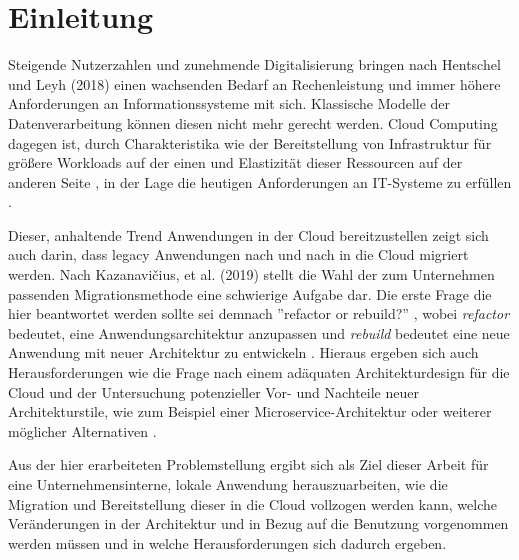 \chapter{Einleitung}
Steigende Nutzerzahlen und zunehmende Digitalisierung bringen nach Hentschel und Leyh (2018) einen wachsenden Bedarf an Rechenleistung und immer höhere Anforderungen an Informationssysteme mit sich. Klassische Modelle der Datenverarbeitung können diesen nicht mehr gerecht werden. Cloud Computing dagegen ist, durch Charakteristika wie der Bereitstellung von Infrastruktur für größere Workloads auf der einen und Elastizität dieser Ressourcen auf der anderen Seite \cite[Vgl.][S. 2]{Mell2011}, in der Lage die heutigen Anforderungen an IT-Systeme zu erfüllen \cite[Vgl.][S. 6]{Reinheimer2018}.

Dieser, anhaltende Trend Anwendungen in der Cloud bereitzustellen zeigt sich auch darin, dass legacy Anwendungen nach und nach in die Cloud migriert werden. Nach Kazanavičius, et al. (2019) stellt die Wahl der zum Unternehmen passenden Migrationsmethode eine schwierige Aufgabe dar. Die erste Frage die hier beantwortet werden sollte sei demnach ''refactor or rebuild?'' \cite[Vgl.][S. 4]{Kazanavicius2019}, wobei \textit{refactor} bedeutet, eine Anwendungsarchitektur anzupassen und \textit{rebuild} bedeutet eine neue Anwendung mit neuer Architektur zu entwickeln \cite[Vgl.][S. 2]{Ahmad2018}. Hieraus ergeben sich auch Herausforderungen wie die Frage nach einem adäquaten Architekturdesign für die Cloud \cite[Vgl.][S. 14]{Pahl} und der Untersuchung potenzieller Vor- und Nachteile neuer Architekturstile, wie zum Beispiel einer Microservice-Architektur oder weiterer möglicher Alternativen \cite[Vgl.][S. 3]{Carrasco2018}.

Aus der hier erarbeiteten Problemstellung ergibt sich als Ziel dieser Arbeit für eine Unternehmensinterne, lokale Anwendung herauszuarbeiten, wie die Migration und Bereitstellung dieser in die Cloud vollzogen werden kann, welche Veränderungen in der Architektur und in Bezug auf die Benutzung vorgenommen werden müssen und in welche Herausforderungen sich dadurch ergeben.

